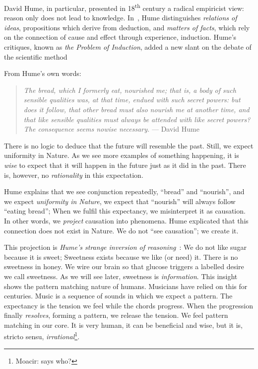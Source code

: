 David Hume, in particular, presented in 18\textsuperscript{th} century a radical empiricist view: reason only does not lead to knowledge. In~\cite{hume:2009}, Hume distinguishes \emph{relations of ideas}, propositions which derive from deduction, and \emph{matters of facts}, which rely on the connection of cause and effect through experience, induction. Hume's critiques, known as \emph{the Problem of Induction}, added a new slant on the debate of the scientific method

From Hume's own words:
\begin{quotation}
	\small \emph{The bread, which I formerly eat, nourished me; that is, a body of such sensible qualities was, at that time, endued with such secret powers: but does it follow, that other bread must also nourish me at another time, and that like sensible qualities must always be attended with like secret powers? The consequence seems nowise necessary.} \flushright --- David Hume
\end{quotation}

There is no logic to deduce that the future will resemble the past. Still, we expect uniformity in Nature. As we see more examples of something happening, it is \emph{wise} to expect that it will happen in the future just as it did in the past. There is, however, no \emph{rationality} in this expectation.

Hume explains that we see conjunction repeatedly, \eg{} ``bread'' and ``nourish'', and we expect \emph{uniformity in Nature}, we expect that ``nourish'' will always follow ``eating bread''; When we fulfil this expectancy, we misinterpret it as causation. In other words, we \emph{project} causation into phenomena. Hume explicated that this connection does not exist in Nature. We do not ``see causation''; we create it.

This projection is \emph{Hume's strange inversion of reasoning}~\cite{huebner:2017}: We do not like sugar because it is sweet; Sweetness exists because we like (or need) it. There is no sweetness in honey. We wire our brain so that glucose triggers a labelled desire we call sweetness. As we will see later, sweetness is \emph{information}. This insight shows the pattern matching nature of humans. Musicians have relied on this for centuries. Music is a sequence of sounds in which we expect a pattern. The expectancy is the tension we feel while the chords progress. When the progression finally \emph{resolves}, forming a pattern, we release the tension. We feel pattern matching in our core. It is very human, it can be beneficial and wise, but it is, stricto sensu, \emph{irrational}\footnote{Moacir: says who?}.

